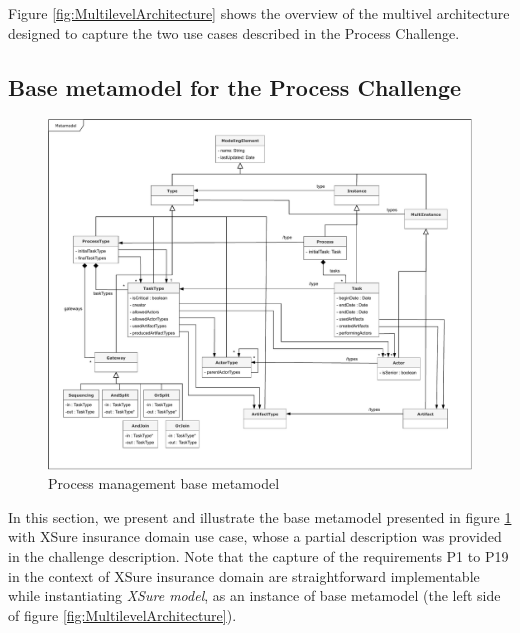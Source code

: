 
Figure \ref{fig:MultilevelArchitecture} shows the overview of the multivel architecture designed to capture the two use cases described in the Process Challenge.


\subsection{Base metamodel for the Process Challenge}

\begin{figure}
 \centering
    \includegraphics[width=1.0 \textwidth]{Figures/Metamodel.pdf}
     \caption{Process management base metamodel}
    \label{fig:BaseMetamodel}
\end{figure}


In this section, we present and illustrate the base metamodel presented in figure \ref{fig:BaseMetamodel} with XSure insurance domain use case, whose a partial description was provided in the challenge description. Note that the capture of the requirements P1 to P19 in the context of XSure insurance domain are straightforward implementable while instantiating \textit{XSure model}, as an instance of base metamodel (the left side of figure \ref{fig:MultilevelArchitecture}).

